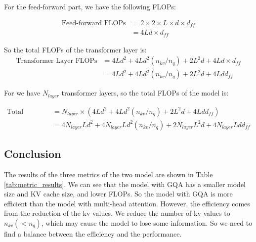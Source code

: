 \documentclass[a4paper,12pt]{article}
\begin{document}
For the feed-forward part, we have the following FLOPs:

\begin{align}
    \text{Feed-forward FLOPs} &= 2\times 2 \times L \times d \times d_{ff} \\
    &= 4Ld \times d_{ff}
\end{align}

So the total FLOPs of the transformer layer is:
\begin{align}
    \text{Transformer Layer FLOPs} &= 4Ld^2 + 4Ld^2(n_{kv}/n_q) + 2L^2d + 4Ld \times d_{ff} \\
    &= 4Ld^2 + 4Ld^2(n_{kv}/n_q) + 2L^2d + 4Ldd_{ff}
\end{align}

For we have $N_{layer}$ transformer layers, so the total FLOPs of the model is:

\begin{align}
    \text{Total FLOPs} &= N_{layer} \times (4Ld^2 + 4Ld^2(n_{kv}/n_q) + 2L^2d + 4Ldd_{ff}) \\
    &= 4N_{layer}Ld^2 + 4N_{layer}Ld^2(n_{kv}/n_q) + 2N_{layer}L^2d + 4N_{layer}Ldd_{ff}
\end{align}

\subsection{Conclusion}

The results of the three metrics of the two model are shown in Table \ref{tab:metric_results}. We can see that the model with GQA has a smaller model size and KV cache size, and lower FLOPs. So the model with GQA is more efficient than the model with multi-head attention. However, the efficiency comes from the reduction of the kv values. We reduce the number of kv values to $n_{kv}(<n_q)$, which may cause the model to lose some information. So we need to find a balance between the efficiency and the performance.
\begin{table}[H]
    \centering
    \caption{Results of the three metrics}
    \label{tab:metric_results}
\end{table}
\end{document}
